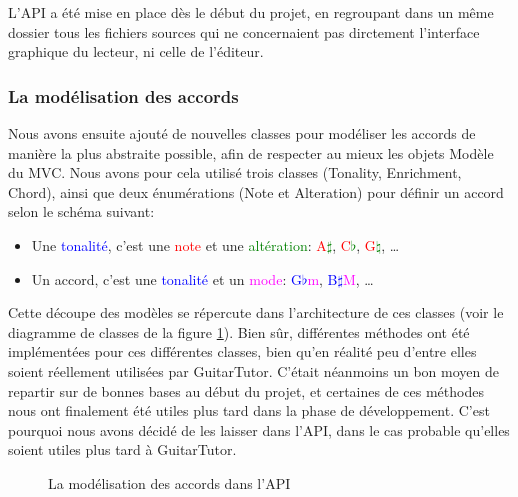 \documentclass[a4paper,11pt]{article}
\begin{document}
L'API a été mise en place dès le début du projet, en regroupant dans un même dossier tous les fichiers sources qui ne concernaient pas dirctement l'interface graphique du lecteur, ni celle de l'éditeur.

\subsubsection*{La modélisation des accords}

Nous avons ensuite ajouté de nouvelles classes pour modéliser les accords de manière la plus abstraite possible, afin de respecter au mieux les objets Modèle du MVC. Nous avons pour cela utilisé trois classes (Tonality, Enrichment, Chord), ainsi que deux énumérations (Note et Alteration) pour définir un accord selon le schéma suivant:
\begin{itemize}
 \item Une \textcolor{blue}{tonalité}, c'est une \textcolor{red}{note} et une \textcolor{green}{altération}: \textcolor{red}{A}\textcolor{green}{$\sharp$}, \textcolor{red}{C}\textcolor{green}{$\flat$}, \textcolor{red}{G}\textcolor{green}{$\natural$}, \dots
 \item Un accord, c'est une \textcolor{blue}{tonalité} et un \textcolor{magenta}{mode}: \textcolor{blue}{G$\flat$}\textcolor{magenta}{m}, \textcolor{blue}{B$\sharp$}\textcolor{magenta}{M}, \dots
\end{itemize}

Cette découpe des modèles se répercute dans l'architecture de ces classes (voir le diagramme de classes de la figure \ref{diag_api_chords}). Bien sûr, différentes méthodes ont été implémentées pour ces différentes classes, bien qu'en réalité peu d'entre elles soient réellement utilisées par GuitarTutor. C'était néanmoins un bon moyen de repartir sur de bonnes bases au début du projet, et certaines de ces méthodes nous ont finalement été utiles plus tard dans la phase de développement. C'est pourquoi nous avons décidé de les laisser dans l'API, dans le cas probable qu'elles soient utiles plus tard à GuitarTutor.

\begin{figure}[H]
\begin{center}
\caption{La modélisation des accords dans l'API}
\label{diag_api_chords}
\end{center}
\end{figure}
\end{document}

